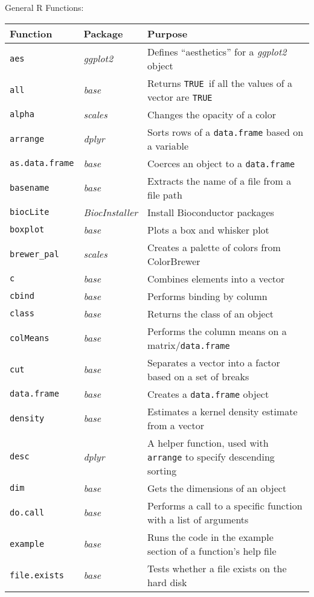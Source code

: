 \documentclass[10pt]{article}
\newcommand{\code}[1]{\texttt{#1}}
\newcommand{\pkg}[1]{\emph{#1}}
\newcommand{\TRUE}{\texttt{TRUE }}
\begin{document}
\clearpage 
General R Functions:
\begin{longtable}{p{1.5in}p{1in}p{5in}}
Function & Package & Purpose \\ \hline
\code{aes} & \pkg{ggplot2} & Defines ``aesthetics'' for a \pkg{ggplot2} object  \\
\code{all} & \pkg{base} & Returns \TRUE if all the values of a vector are \TRUE \\
\code{alpha} & \pkg{scales} & Changes the opacity of a color \\
\code{arrange} & \pkg{dplyr} & Sorts rows of a \code{data.frame} based on a variable \\
\code{as.data.frame} & \pkg{base} & Coerces an object to a \code{data.frame} \\
\code{basename} & \pkg{base} & Extracts the name of a file from a file path\\
\code{biocLite} & \pkg{BiocInstaller} & Install Bioconductor packages \\
\code{boxplot} & \pkg{base} & Plots a box and whisker plot \\
\code{brewer\_pal} & \pkg{scales} & Creates a palette of colors from ColorBrewer \\
\code{c} & \pkg{base} & Combines elements into a vector \\
\code{cbind} & \pkg{base} & Performs binding by column \\
\code{class} & \pkg{base} & Returns the class of an object \\
\code{colMeans} & \pkg{base} & Performs the column means on a matrix/\code{data.frame} \\
\code{cut} & \pkg{base} & Separates a vector into a factor based on a set of breaks \\
\code{data.frame} & \pkg{base} & Creates a \code{data.frame} object \\
\code{density} & \pkg{base} & Estimates a kernel density estimate from a vector\\
\code{desc} & \pkg{dplyr} & A helper function, used with \code{arrange} to specify descending sorting \\
\code{dim} & \pkg{base} & Gets the dimensions of an object \\
\code{do.call} & \pkg{base} & Performs a call to a specific function with a list of arguments \\
\code{example} & \pkg{base} & Runs the code in the example section of a function's help file \\
\code{file.exists} & \pkg{base} & Tests whether a file exists on the hard disk \\

\end{longtable}
\end{document}
